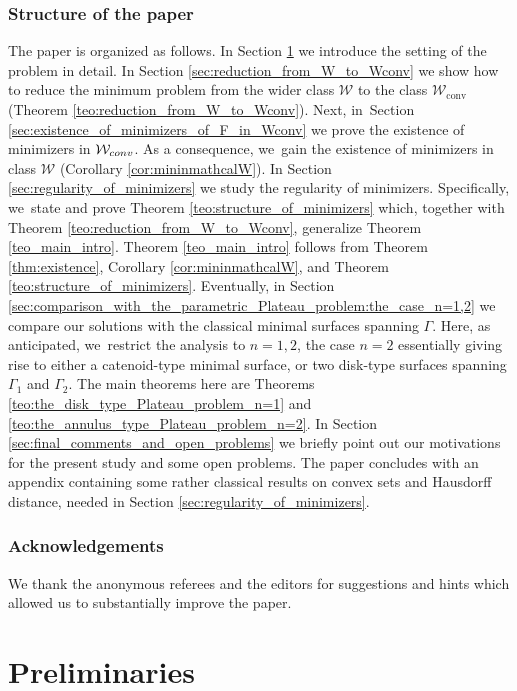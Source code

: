\documentclass[11pt]{article}
\numberwithin{equation}{section}
\newcommand{\admclass}{\mathcal W}
\newcommand\admclassconv{{\mathcal W_\mathrm{conv}}}
\theoremstyle{definition}
\begin{document}
\subsubsection*{Structure of the paper} The paper is organized as follows.
In Section \ref{sec:preliminaries} we introduce the
setting of the problem in detail.
In Section
\ref{sec:reduction_from_W_to_Wconv}
we show how to reduce the minimum problem
from the wider class $\admclass$ to the class $\admclassconv$
(Theorem \ref{teo:reduction_from_W_to_Wconv}).
Next,
in~Section
\ref{sec:existence_of_minimizers_of_F_in_Wconv}
we prove the existence of minimizers in $\mathcal
W_{\textup{conv}}$. As a consequence, we~gain
the existence of minimizers in class $\mathcal W$ (Corollary \ref{cor:mininmathcalW}).
In Section
\ref{sec:regularity_of_minimizers} we study the regularity of minimizers. Specifically, we~state and prove Theorem \ref{teo:structure_of_minimizers}
which, together with Theorem \ref{teo:reduction_from_W_to_Wconv}, generalize Theorem \ref{teo_main_intro}. Theorem \ref{teo_main_intro}
follows from Theorem \ref{thm:existence}, Corollary \ref{cor:mininmathcalW}, and Theorem \ref{teo:structure_of_minimizers}.
Eventually, in Section \ref{sec:comparison_with_the_parametric_Plateau_problem:the_case_n=1,2}
we compare our solutions with the classical minimal surfaces spanning $\Gamma$. Here, as anticipated, we~restrict the analysis to $n=1,2$,
the case $n=2$ essentially giving rise to either a catenoid-type minimal surface, or two disk-type surfaces spanning $\Gamma_1$ and $\Gamma_2$. The main theorems here are Theorems \ref{teo:the_disk_type_Plateau_problem_n=1} and \ref{teo:the_annulus_type_Plateau_problem_n=2}.
In Section \ref{sec:final_comments_and_open_problems}
we briefly point out our motivations for the present study and some open problems.
The paper concludes with an appendix containing some rather classical
results on convex sets and Hausdorff distance, needed in
Section \ref{sec:regularity_of_minimizers}.

\subsubsection*{Acknowledgements}
We thank the anonymous referees and the editors for suggestions and hints which allowed us to substantially improve the paper.

\section{Preliminaries}\label{sec:preliminaries}
\end{document}

